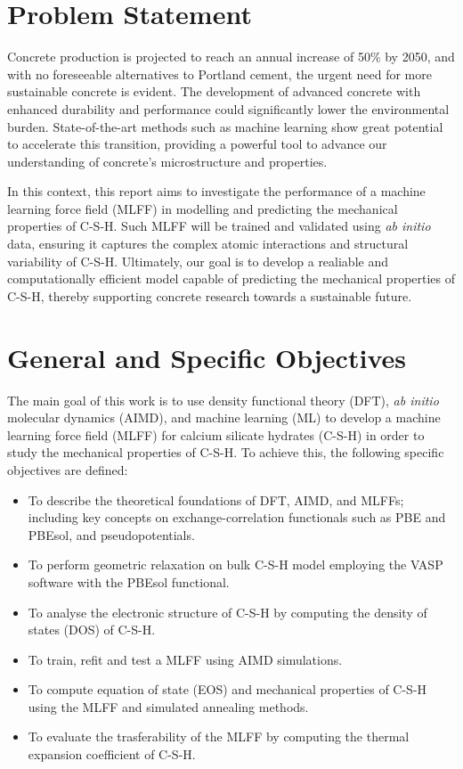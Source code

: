 \section{Problem Statement}
Concrete production is projected to reach an annual increase of 50\% by 2050\supercite{Monteiro2017}, and with no foreseeable alternatives to Portland cement, the urgent need for more sustainable concrete is evident. The development of advanced concrete with enhanced durability and performance could significantly lower the environmental burden. State-of-the-art methods such as machine learning show great potential to accelerate this transition, providing a powerful tool to advance our understanding of concrete's microstructure and properties. 

In this context, this report aims to investigate the performance of a machine learning force field (MLFF) in modelling and predicting the mechanical properties of C-S-H. Such MLFF will be trained and validated
using \emph{ab initio} data, ensuring it captures the complex atomic interactions and structural variability of C-S-H. Ultimately, our goal is to develop a realiable and computationally efficient model capable of predicting the mechanical properties of C-S-H, thereby supporting concrete research towards a sustainable future.

\section{General and Specific Objectives}
The main goal of this work is to use density functional theory (DFT), \emph{ab initio} molecular dynamics (AIMD), and machine learning (ML) to
develop a machine learning force field (MLFF) for calcium silicate hydrates (C-S-H) in order to study the mechanical properties of C-S-H. To achieve this, the following specific objectives are defined:
\begin{itemize}
    \item To describe the theoretical foundations of DFT, AIMD, and MLFFs; including key concepts on exchange-correlation functionals such as PBE and PBEsol, and pseudopotentials. 
    \item To perform geometric relaxation on bulk C-S-H model employing the VASP software with the PBEsol functional.
    \item To analyse the electronic structure of C-S-H by computing the density of states (DOS) of C-S-H.
    \item To train, refit and test a MLFF using AIMD simulations. 
    \item To compute equation of state (EOS) and mechanical properties of C-S-H using the MLFF and simulated annealing methods.
    \item To evaluate the trasferability of the MLFF by computing the thermal expansion coefficient of C-S-H. 
\end{itemize}

